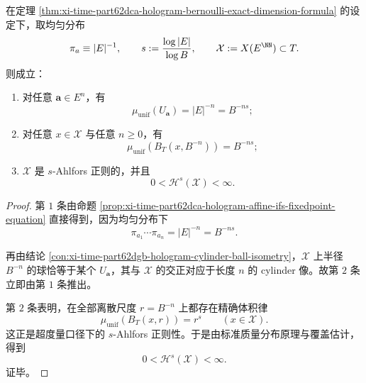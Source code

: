 \begin{corollary}\label{cor:xi-time-part62dca-hologram-uniform-ahlfors-regularity}
在定理 \ref{thm:xi-time-part62dca-hologram-bernoulli-exact-dimension-formula} 的设定下，取均匀分布
\[
\pi_a\equiv |E|^{-1},
\qquad
s:=\frac{\log |E|}{\log B},
\qquad
\mathcal X:=X(E^{\NN})\subset T.
\]
则成立：
\begin{enumerate}
  \item 对任意 \(\mathbf a\in E^n\)，有
        \[
        \mu_{\mathrm{unif}}(U_{\mathbf a})
        =
        |E|^{-n}
        =
        B^{-ns};
        \]
  \item 对任意 \(x\in\mathcal X\) 与任意 \(n\ge 0\)，有
        \[
        \mu_{\mathrm{unif}}(B_T(x,B^{-n}))
        =
        B^{-ns};
        \]
  \item \(\mathcal X\) 是 \(s\)-Ahlfors 正则的，并且
        \[
        0<\mathcal H^s(\mathcal X)<\infty.
        \]
\end{enumerate}
\end{corollary}
\begin{proof}
第 \(1\) 条由命题 \ref{prop:xi-time-part62dca-hologram-affine-ifs-fixedpoint-equation} 直接得到，因为均匀分布下
\[
\pi_{a_1}\cdots \pi_{a_n}=|E|^{-n}=B^{-ns}.
\]

再由结论 \ref{con:xi-time-part62dgb-hologram-cylinder-ball-isometry}，\(\mathcal X\) 上半径 \(B^{-n}\) 的球恰等于某个 \(U_{\mathbf a}\)，其与 \(\mathcal X\) 的交正对应于长度 \(n\) 的 cylinder 像。故第 \(2\) 条立即由第 \(1\) 条推出。

第 \(2\) 条表明，在全部离散尺度 \(r=B^{-n}\) 上都存在精确体积律
\[
\mu_{\mathrm{unif}}(B_T(x,r))=r^s
\qquad (x\in\mathcal X).
\]
这正是超度量口径下的 \(s\)-Ahlfors 正则性。于是由标准质量分布原理与覆盖估计，得到
\[
0<\mathcal H^s(\mathcal X)<\infty.
\]
证毕。
\end{proof}

